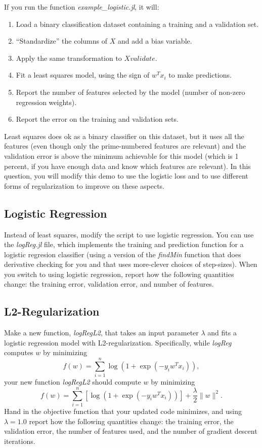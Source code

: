 \documentclass{article}
\def\blu#1{{\color{blu}#1}}
\def\norm#1{\|#1\|}
\def\enum#1{\begin{enumerate}#1\end{enumerate}}
\begin{document}
If you run the function \emph{example\_logistic.jl}, it will:
\enum{
\item Load a binary classification dataset containing a training and a validation set.
\item ``Standardize'' the columns of $X$ and add a bias variable.
\item Apply the same transformation to $Xvalidate$.
\item Fit a least squares model, using the sign of $w^Tx_i$ to make predictions.
\item Report the number of features selected by the model (number of non-zero regression weights).
\item Report the error on the training and validation sets.
}
Least squares does ok as a binary classifier on this dataset, but it uses all the features (even though only the prime-numbered features are relevant) and the validation error is above the minimum achievable for this model (which is 1 percent, if you have enough data and know which features are relevant). In this question, you will modify this demo to use the logistic loss and to use different forms of regularization to improve on these aspects.


\subsection{Logistic Regression}

Instead of least squares, modify the script to use logistic regression. You can use the \emph{logReg.jl} file, which implements the training and prediction function for a logistic regresion classifier (using a  version of the \emph{findMin} function that does derivative checking for you and that uses more-clever choices of step-sizes). When you switch to using logistic regression, \blu{report how the following quantities change: the training error, validation error, and number of features}.

\subsection{L2-Regularization}

Make a new function, \emph{logRegL2}, that takes an input parameter $\lambda$ and fits a logistic regression model with L2-regularization. Specifically, while \emph{logReg} computes $w$ by minimizing
\[
f(w) = \sum_{i=1}^n \log(1+\exp(-y_iw^Tx_i)),
\]
your new function \emph{logRegL2} should compute $w$ by minimizing
\[
f(w) = \sum_{i=1}^n \left[\log(1+\exp(-y_iw^Tx_i))\right] + \frac{\lambda}{2}\norm{w}^2.
\]
\blu{Hand in the objective function that your updated code minimizes, and using $\lambda=1.0$ report how the following quantities change: the training error, the validation error, the number of features used, and the number of gradient descent iterations.}
\end{document}
